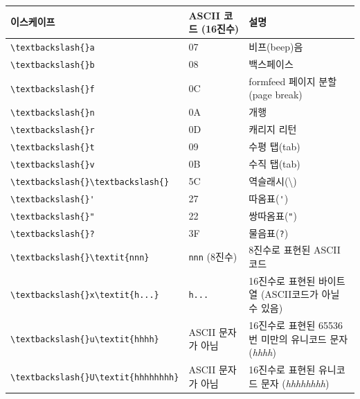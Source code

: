 \documentclass[a4paper,12pt]{book}
\newcommand{\V}[1]{\Verb|#1|}
\begin{document}
\begin{appendices}
\begin{longtable}{ || m{6em} | m{10em} | m{13em} || }
        \hline 이스케이프 & ASCII 코드 (16진수) & 설명 \\
        \hline
        \hline\V{\textbackslash{}a}                  & 07                & 비프(beep)음                                                 \\
        \hline\V{\textbackslash{}b}                  & 08                & 백스페이스                                                   \\
        \hline\V{\textbackslash{}f}                  & 0C                & formfeed 페이지 분할(page break)                             \\
        \hline\V{\textbackslash{}n}                  & 0A                & 개행                                                         \\
        \hline\V{\textbackslash{}r}                  & 0D                & 캐리지 리턴                                                  \\
        \hline\V{\textbackslash{}t}                  & 09                & 수평 탭(tab)                                                 \\
        \hline\V{\textbackslash{}v}                  & 0B                & 수직 탭(tab)                                                 \\
        \hline\V{\textbackslash{}\textbackslash{}}   & 5C                & 역슬래시(\textbackslash{})                                   \\
        \hline\V{\textbackslash{}'}                  & 27                & 따옴표(\V{'})                                                \\
        \hline\V{\textbackslash{}"}                  & 22                & 쌍따옴표(\V{"})                                              \\
        \hline\V{\textbackslash{}?}                  & 3F                & 물음표(\V{?})                                                \\
        \hline\V{\textbackslash{}\textit{nnn}}       & \V{nnn} (8진수)   & 8진수로 표현된 ASCII 코드                                    \\
        \hline\V{\textbackslash{}x\textit{h...}}     & \V{h...}          & 16진수로 표현된 바이트열 (ASCII코드가 아닐 수 있음)          \\
        \hline\V{\textbackslash{}u\textit{hhhh}}     & ASCII 문자가 아님 & 16진수로 표현된 65536번 미만의 유니코드 문자 (\textit{hhhh}) \\
        \hline\V{\textbackslash{}U\textit{hhhhhhhh}} & ASCII 문자가 아님 & 16진수로 표현된 유니코드 문자 (\textit{hhhhhhhh})            \\
        \hline
    \end{longtable}
\endgroup


\end{appendices}
\end{document}
